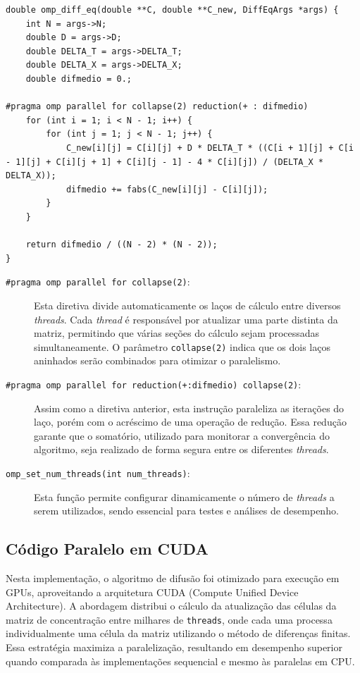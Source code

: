 \documentclass[12pt]{article}
\begin{document}
\begin{lstlisting}[style=CStyle, caption={Implementação paralelizada utilizando a biblioteca OpenMP.}, label={cod:omp}]
double omp_diff_eq(double **C, double **C_new, DiffEqArgs *args) {
    int N = args->N;
    double D = args->D;
    double DELTA_T = args->DELTA_T;
    double DELTA_X = args->DELTA_X;
    double difmedio = 0.;

#pragma omp parallel for collapse(2) reduction(+ : difmedio)
    for (int i = 1; i < N - 1; i++) {
        for (int j = 1; j < N - 1; j++) {
            C_new[i][j] = C[i][j] + D * DELTA_T * ((C[i + 1][j] + C[i - 1][j] + C[i][j + 1] + C[i][j - 1] - 4 * C[i][j]) / (DELTA_X * DELTA_X));
            difmedio += fabs(C_new[i][j] - C[i][j]);
        }
    }

    return difmedio / ((N - 2) * (N - 2));
}
\end{lstlisting}

\begin{description}
  \item[\texttt{\#pragma omp parallel for collapse(2)}:]
        Esta diretiva divide automaticamente os laços de cálculo entre diversos \textit{threads}. Cada \textit{thread} é responsável por atualizar uma parte distinta da matriz, permitindo que várias seções do cálculo sejam processadas simultaneamente. O parâmetro \texttt{collapse(2)} indica que os dois laços aninhados serão combinados para otimizar o paralelismo.

  \item[\texttt{\#pragma omp parallel for reduction(+:difmedio) collapse(2)}:]
        Assim como a diretiva anterior, esta instrução paraleliza as iterações do laço, porém com o acréscimo de uma operação de redução. Essa redução garante que o somatório, utilizado para monitorar a convergência do algoritmo, seja realizado de forma segura entre os diferentes \textit{threads}.

  \item[\texttt{omp\_set\_num\_threads(int num\_threads)}:]
        Esta função permite configurar dinamicamente o número de \textit{threads} a serem utilizados, sendo essencial para testes e análises de desempenho.
\end{description}

\subsection{Código Paralelo em CUDA}

Nesta implementação, o algoritmo de difusão foi otimizado para execução em
GPUs, aproveitando a arquitetura CUDA (Compute Unified Device Architecture). A
abordagem distribui o cálculo da atualização das células da matriz de
concentração entre milhares de \texttt{threads}, onde cada uma processa
individualmente uma célula da matriz utilizando o método de diferenças finitas.
Essa estratégia maximiza a paralelização, resultando em desempenho superior
quando comparada às implementações sequencial e mesmo às paralelas em CPU.
\end{document}
